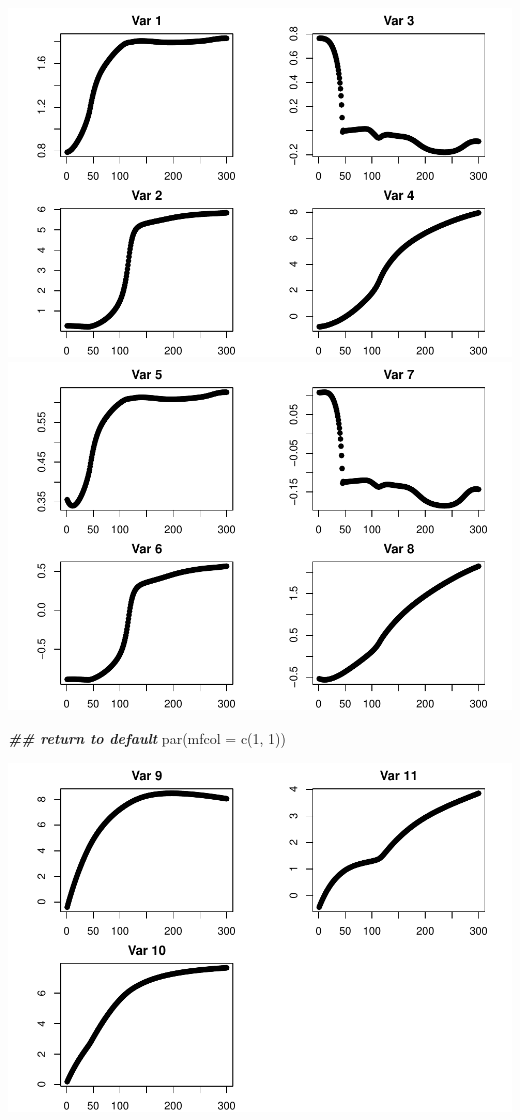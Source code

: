 \documentclass[
]{book}
\newenvironment{Shaded}{\begin{snugshade}}{\end{snugshade}}
\newcommand{\AttributeTok}[1]{\textcolor[rgb]{0.77,0.63,0.00}{#1}}
\newcommand{\DecValTok}[1]{\textcolor[rgb]{0.00,0.00,0.81}{#1}}
\newcommand{\DocumentationTok}[1]{\textcolor[rgb]{0.56,0.35,0.01}{\textbf{\textit{#1}}}}
\newcommand{\FunctionTok}[1]{\textcolor[rgb]{0.00,0.00,0.00}{#1}}
\newcommand{\NormalTok}[1]{#1}
\begin{document}
\includegraphics{_main_files/figure-latex/unnamed-chunk-6-1.pdf} \includegraphics{_main_files/figure-latex/unnamed-chunk-6-2.pdf}

\begin{Shaded}
\begin{Highlighting}[]
\DocumentationTok{\#\# return to default}
\FunctionTok{par}\NormalTok{(}\AttributeTok{mfcol =} \FunctionTok{c}\NormalTok{(}\DecValTok{1}\NormalTok{, }\DecValTok{1}\NormalTok{))}
\end{Highlighting}
\end{Shaded}

\includegraphics{_main_files/figure-latex/unnamed-chunk-6-3.pdf}
\end{document}
